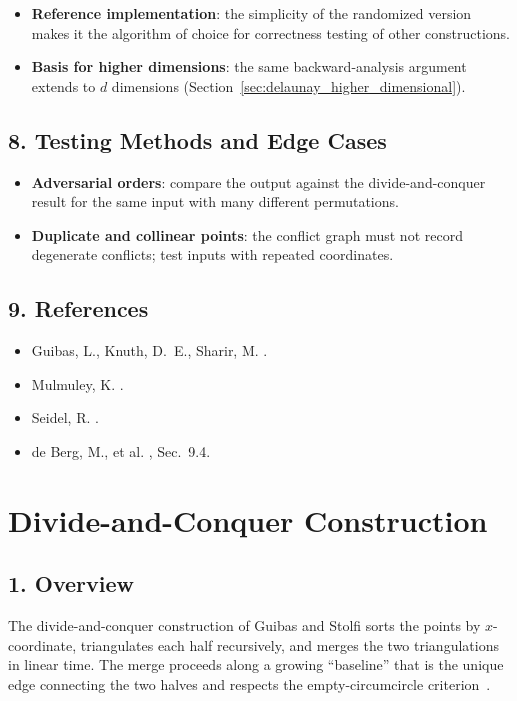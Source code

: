 \begin{itemize}
\item \textbf{Reference implementation}: the simplicity of the randomized
  version makes it the algorithm of choice for correctness testing of other
  constructions.
\item \textbf{Basis for higher dimensions}: the same backward-analysis argument
  extends to $d$ dimensions (Section~\ref{sec:delaunay_higher_dimensional}).
\end{itemize}

\subsection{8. Testing Methods and Edge Cases}

\begin{itemize}
\item \textbf{Adversarial orders}: compare the output against the
  divide-and-conquer result for the same input with many different
  permutations.
\item \textbf{Duplicate and collinear points}: the conflict graph must not
  record degenerate conflicts; test inputs with repeated coordinates.
\end{itemize}

\subsection{9. References}

\begin{itemize}
\item Guibas, L., Knuth, D.~E., Sharir, M. \cite{guibas1992}.
\item Mulmuley, K. \cite{mulmuley1990}.
\item Seidel, R. \cite{seidel1991}.
\item de Berg, M., et al. \cite{deberg2008}, Sec.~9.4.
\end{itemize}

\section{Divide-and-Conquer Construction}
\label{sec:delaunay_divide_conquer}

\subsection{1. Overview}

The divide-and-conquer construction of Guibas and
Stolfi sorts the points by $x$-coordinate, triangulates each half recursively,
and merges the two triangulations in linear time. The merge proceeds along a
growing ``baseline'' that is the unique edge connecting the two halves and
respects the empty-circumcircle criterion~\cite{guibas1985}.

